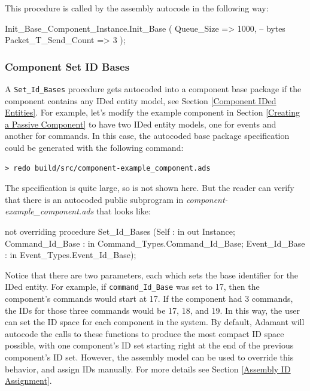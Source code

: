 This procedure is called by the assembly autocode in the following way:

\vspace{5mm} %
\begin{adacode}
  Init_Base_Component_Instance.Init_Base (
    Queue_Size => 1000,         -- bytes
    Packet_T_Send_Count => 3 
  );
\end{adacode}
\vspace{5mm} %

\subsubsection{Component Set ID Bases} \label{Component Set ID Bases}

A \texttt{Set\_Id\_Bases} procedure gets autocoded into a component base package if the component contains any IDed entity model, see Section \ref{Component IDed Entities}. For example, let's modify the example component in Section \ref{Creating a Passive Component} to have two IDed entity models, one for events and another for commands. In this case, the autocoded base package specification could be generated with the following command:

\vspace{5mm} %
\begin{verbatim}
> redo build/src/component-example_component.ads
\end{verbatim}
\vspace{5mm} %

The specification is quite large, so is not shown here. But the reader can verify that there is an autocoded public subprogram in \textit{component-example\_component.ads} that looks like:

\vspace{5mm} %
\begin{adacode}
not overriding procedure Set_Id_Bases (Self : in out Instance; Command_Id_Base : in Command_Types.Command_Id_Base; Event_Id_Base : in Event_Types.Event_Id_Base);
\end{adacode}
\vspace{5mm} %

Notice that there are two parameters, each which sets the base identifier for the IDed entity. For example, if \texttt{command\_Id\_Base} was set to 17, then the component's commands would start at 17. If the component had 3 commands, the IDs for those three commands would be 17, 18, and 19. In this way, the user can set the ID space for each component in the system. By default, Adamant will autocode the calls to these functions to produce the most compact ID space possible, with one component's ID set starting right at the end of the previous component's ID set. However, the assembly model can be used to override this behavior, and assign IDs manually. For more details see Section \ref{Assembly ID Assignment}. \\

